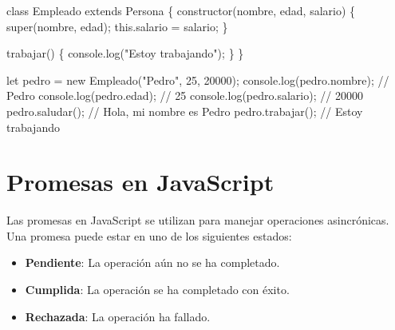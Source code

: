 \documentclass[
  a4paper,
  DIV=11,
  numbers=noendperiod,
  onepage,
  openany]{scrreprt}
\newenvironment{Shaded}{\begin{snugshade}}{\end{snugshade}}
\newcommand{\AttributeTok}[1]{\textcolor[rgb]{0.40,0.45,0.13}{#1}}
\newcommand{\BuiltInTok}[1]{\textcolor[rgb]{0.00,0.23,0.31}{#1}}
\newcommand{\CommentTok}[1]{\textcolor[rgb]{0.37,0.37,0.37}{#1}}
\newcommand{\DecValTok}[1]{\textcolor[rgb]{0.68,0.00,0.00}{#1}}
\newcommand{\FunctionTok}[1]{\textcolor[rgb]{0.28,0.35,0.67}{#1}}
\newcommand{\KeywordTok}[1]{\textcolor[rgb]{0.00,0.23,0.31}{#1}}
\newcommand{\NormalTok}[1]{\textcolor[rgb]{0.00,0.23,0.31}{#1}}
\newcommand{\OperatorTok}[1]{\textcolor[rgb]{0.37,0.37,0.37}{#1}}
\newcommand{\StringTok}[1]{\textcolor[rgb]{0.13,0.47,0.30}{#1}}
\providecommand{\tightlist}{%
  \setlength{\itemsep}{0pt}\setlength{\parskip}{0pt}}\usepackage{longtable,booktabs,array}
\begin{document}
\begin{Shaded}
\begin{Highlighting}[]
\KeywordTok{class}\NormalTok{ Empleado }\KeywordTok{extends}\NormalTok{ Persona \{}
    \FunctionTok{constructor}\NormalTok{(nombre}\OperatorTok{,}\NormalTok{ edad}\OperatorTok{,}\NormalTok{ salario) \{}
        \KeywordTok{super}\NormalTok{(nombre}\OperatorTok{,}\NormalTok{ edad)}\OperatorTok{;}
        \KeywordTok{this}\OperatorTok{.}\AttributeTok{salario} \OperatorTok{=}\NormalTok{ salario}\OperatorTok{;}
\NormalTok{    \}}

    \FunctionTok{trabajar}\NormalTok{() \{}
        \BuiltInTok{console}\OperatorTok{.}\FunctionTok{log}\NormalTok{(}\StringTok{"Estoy trabajando"}\NormalTok{)}\OperatorTok{;}
\NormalTok{    \}}
\NormalTok{\}}

\KeywordTok{let}\NormalTok{ pedro }\OperatorTok{=} \KeywordTok{new} \FunctionTok{Empleado}\NormalTok{(}\StringTok{"Pedro"}\OperatorTok{,} \DecValTok{25}\OperatorTok{,} \DecValTok{20000}\NormalTok{)}\OperatorTok{;}
\BuiltInTok{console}\OperatorTok{.}\FunctionTok{log}\NormalTok{(pedro}\OperatorTok{.}\AttributeTok{nombre}\NormalTok{)}\OperatorTok{;} \CommentTok{// Pedro}
\BuiltInTok{console}\OperatorTok{.}\FunctionTok{log}\NormalTok{(pedro}\OperatorTok{.}\AttributeTok{edad}\NormalTok{)}\OperatorTok{;} \CommentTok{// 25}
\BuiltInTok{console}\OperatorTok{.}\FunctionTok{log}\NormalTok{(pedro}\OperatorTok{.}\AttributeTok{salario}\NormalTok{)}\OperatorTok{;} \CommentTok{// 20000}
\NormalTok{pedro}\OperatorTok{.}\FunctionTok{saludar}\NormalTok{()}\OperatorTok{;} \CommentTok{// Hola, mi nombre es Pedro}
\NormalTok{pedro}\OperatorTok{.}\FunctionTok{trabajar}\NormalTok{()}\OperatorTok{;} \CommentTok{// Estoy trabajando}
\end{Highlighting}
\end{Shaded}

\section{Promesas en JavaScript}\label{promesas-en-javascript}

Las promesas en JavaScript se utilizan para manejar operaciones
asincrónicas. Una promesa puede estar en uno de los siguientes estados:

\begin{itemize}
\tightlist
\item
  \textbf{Pendiente}: La operación aún no se ha completado.
\item
  \textbf{Cumplida}: La operación se ha completado con éxito.
\item
  \textbf{Rechazada}: La operación ha fallado.
\end{itemize}
\end{document}
